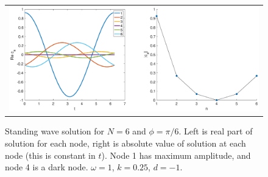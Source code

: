 \documentclass[12pt]{article}
\begin{document}
\begin{figure}[H]
\begin{center}
\begin{tabular}{c}
\includegraphics[width=15cm]{images/evenhole6.eps}
\end{tabular}
\end{center}
\caption{Standing wave solution for $N = 6$ and $\phi = \pi/6$. Left is real part of solution for each node, right is absolute value of solution at each node (this is constant in $t$). Node 1 has maximum amplitude, and node 4 is a dark node. $\omega = 1$, $k = 0.25$, $d=-1$.}
\label{fig:evenhole6}
\end{figure}
\end{document}
